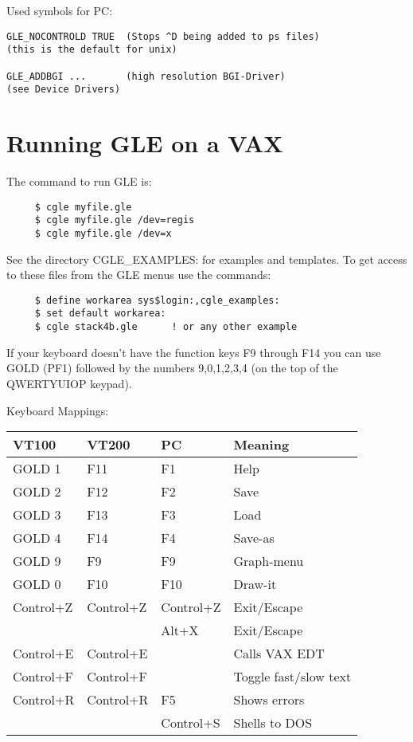 Used symbols for PC:
\begin{verbatim}
GLE_NOCONTROLD TRUE  (Stops ^D being added to ps files)
(this is the default for unix)

GLE_ADDBGI ...       (high resolution BGI-Driver)
(see Device Drivers)
\end{verbatim}
%
%

%

\section{Running GLE on a VAX}
The command to run GLE is:
\begin{verbatim}
     $ cgle myfile.gle
     $ cgle myfile.gle /dev=regis
     $ cgle myfile.gle /dev=x
\end{verbatim}
See the directory CGLE\_EXAMPLES: for examples and templates.
To get access to these files from the GLE menus use the commands:
\begin{verbatim}
     $ define workarea sys$login:,cgle_examples:
     $ set default workarea:
     $ cgle stack4b.gle      ! or any other example
\end{verbatim}

If your keyboard doesn't have the function keys F9 through F14 you can
use GOLD (PF1) followed by the numbers 9,0,1,2,3,4 (on the top of the
QWERTYUIOP keypad).

Keyboard Mappings:\\
\begin{center}
\begin{tabular}{|l|l|l|l|} \hline
VT100  & VT200 &  PC	& Meaning	\\ \hline
GOLD 1 & F11  & F1	& Help 		\\
GOLD 2 & F12  & F2	& Save		\\
GOLD 3 & F13  & F3	& Load		\\
GOLD 4 & F14  & F4	& Save-as	\\
GOLD 9 & F9   & F9   	& Graph-menu	\\
GOLD 0 & F10  & F10  	& Draw-it 	\\
Control+Z & Control+Z & Control+Z 	& Exit/Escape \\
& & Alt+X		& Exit/Escape \\
Control+E & Control+E  & 	& Calls VAX EDT	\\
Control+F & Control+F  & 	& Toggle fast/slow text \\
Control+R & Control+R  & F5	& Shows errors \\
& & Control+S	& Shells to DOS \\ \hline
\end{tabular}
\end{center}

